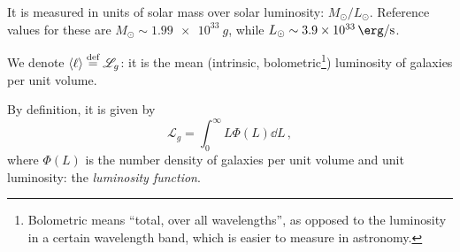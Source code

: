 \documentclass[main.tex]{subfiles}
\begin{document}

It is measured in units of solar mass over solar luminosity: \(M_{\odot} / L_{\odot}\).
Reference values for these are \(M_{\odot} \sim \SI{1.99e33}{g}\), while \(L_\odot \sim \SI{3.9e33}{\erg\per\second} \).

We denote \( \expval{\ell} \stackrel{\text{def}}{=} \mathscr L_g  \): it is the mean (intrinsic, bolometric\footnote{Bolometric means ``total, over all wavelengths'', as opposed to the luminosity in a certain wavelength band, which is easier to measure in astronomy.}) luminosity of galaxies per unit volume.

By definition, it is given by 
%
\begin{equation}
  \mathscr L _g = \int_0^\infty  L \Phi(L) \dd{L}
\,,
\end{equation}
%
where \(\Phi(L)\) is the number density of galaxies per unit volume and unit luminosity: the \emph{luminosity function}.
\end{document}
